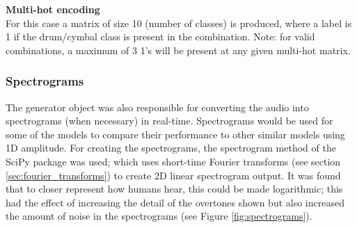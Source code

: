 \documentclass[12pt]{article}
\begin{document}
    \textbf{Multi-hot encoding}\\
    For this case a matrix of size 10 (number of classes) is produced, where a label is 1 if the drum/cymbal class is present in the combination. Note: for valid combinations, a maximum of 3 1's will be present at any given multi-hot matrix.\medskip
    
    \subsubsection{Spectrograms}
    \label{sec:spectrograms}
    The generator object was also responsible for converting the audio into spectrograms (when necessary) in real-time. Spectrograms would be used for some of the models to compare their performance to other similar models using 1D amplitude. For creating the spectrograms, the spectrogram method of the SciPy package was used; which uses short-time Fourier transforms (see section \ref{sec:fourier_transforms}) to create 2D linear spectrogram output. It was found that to closer represent how humans hear, this could be made logarithmic; this had the effect of increasing the detail of the overtones shown but also increased the amount of noise in the spectrograms (see Figure \ref{fig:spectrograms}).\medskip
    
\end{document}
